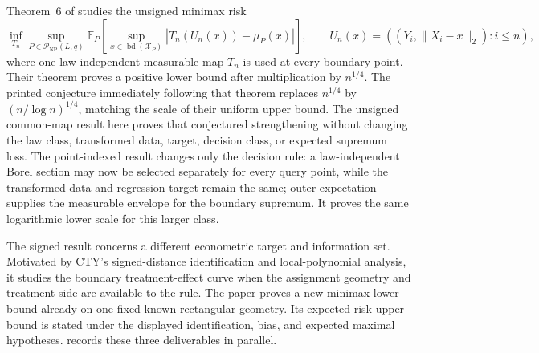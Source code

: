 \documentclass[11pt]{article}
\begin{document}
Theorem~6 of \citet{CattaneoTitiunikYu2026Distance} studies the unsigned minimax risk
\[
\inf_{T_n}\sup_{P\in\mathcal P_{\mathrm{NP}}(L,q)}
\mathbb E_P\!\left[\sup_{x\in\operatorname{bd}(\mathcal X_P)}
\left|T_n(U_n(x))-\mu_P(x)\right|\right],
\qquad
U_n(x)=((Y_i,\lVert X_i-x\rVert_2):i\le n),
\]
where one law-independent measurable map \(T_n\) is used at every boundary point. Their theorem proves a positive lower bound after multiplication by \(n^{1/4}\). The printed conjecture immediately following that theorem replaces \(n^{1/4}\) by \((n/\log n)^{1/4}\), matching the scale of their uniform upper bound. The unsigned common-map result here proves that conjectured strengthening without changing the law class, transformed data, target, decision class, or expected supremum loss. The point-indexed result changes only the decision rule: a law-independent Borel section may now be selected separately for every query point, while the transformed data and regression target remain the same; outer expectation supplies the measurable envelope for the boundary supremum. It proves the same logarithmic lower scale for this larger class.

The signed result concerns a different econometric target and information set. Motivated by CTY's signed-distance identification and local-polynomial analysis, it studies the boundary treatment-effect curve when the assignment geometry and treatment side are available to the rule. The paper proves a new minimax lower bound already on one fixed known rectangular geometry. Its expected-risk upper bound is stated under the displayed identification, bias, and expected maximal hypotheses.  records these three deliverables in parallel.
\end{document}
